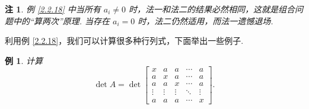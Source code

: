 \documentclass[10pt,openany]{article}
\theoremstyle{thmstyle} %
\theoremstyle{defstyle} %
\theoremstyle{prostyle} %
\theoremstyle{exastyle}
\newtheorem{example}[theorem]{例}
\theoremstyle{remstyle}
\newtheorem{remark}[theorem]{注}
\begin{document}
\begin{remark}
	例 \ref{2.2.18} 中当所有 \( a_i \neq 0 \) 时，法一和法二的结果必然相同，这就是组合问题中的“算两次”原理. 当存在 \( a_i =0 \) 时，法二仍然适用，而法一遗憾退场.
\end{remark}

利用例 \ref{2.2.18}，我们可以计算很多种行列式，下面举出一些例子.

\begin{example}
	计算 \[
	\det A= \det \begin{bmatrix}
		x & a & a & \cdots & a \\
		a & x & a & \cdots & a \\
		a & a & x & \cdots & a \\
		\vdots & \vdots & \vdots & \ddots & \vdots \\
		a & a & a & \cdots & x
	\end{bmatrix}.
	\]
	\label{2.2.20}
\end{example}
\end{document}
